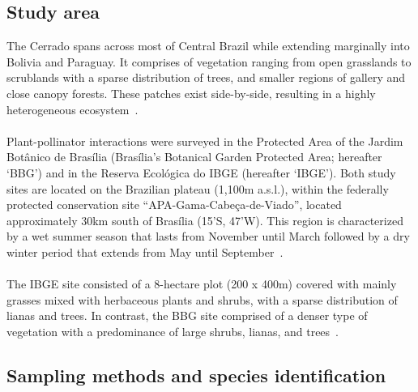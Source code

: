 \documentclass[11pt]{article}
\begin{document}
\subsection{Study area}
The Cerrado spans across most of Central Brazil while extending marginally into Bolivia and Paraguay. It comprises of vegetation ranging from open grasslands to scrublands with a sparse distribution of trees, and smaller regions of gallery and close canopy forests. These patches exist side-by-side, resulting in a highly heterogeneous ecosystem~\citep{Gottsberger2006}. \\
\\
Plant-pollinator interactions were surveyed in the Protected Area of the Jardim Bot\^anico de Bras\'ilia (Bras\'ilia's Botanical Garden Protected Area; hereafter `BBG') and in the Reserva Ecol\'ogica do IBGE (hereafter `IBGE'). Both study sites are located on the Brazilian plateau (1,100m a.s.l.), within the federally protected conservation site ``APA-Gama-Cabe\c ca-de-Viado'', located approximately 30km south of Bras\'ilia (15'S, 47'W). This region is characterized by a wet summer season that lasts from November until March followed by a dry winter period that extends from May until September~\citep{Gottsberger2006a}.\\
\\
The IBGE site consisted of a 8-hectare plot (200 x 400m) covered with mainly grasses mixed with herbaceous plants and shrubs, with a sparse distribution of lianas and trees. In contrast, the BBG site comprised of a denser type of vegetation with a predominance of large shrubs, lianas, and trees~\citep{Eiten1972}.

\subsection{Sampling methods and species identification}
\end{document}
